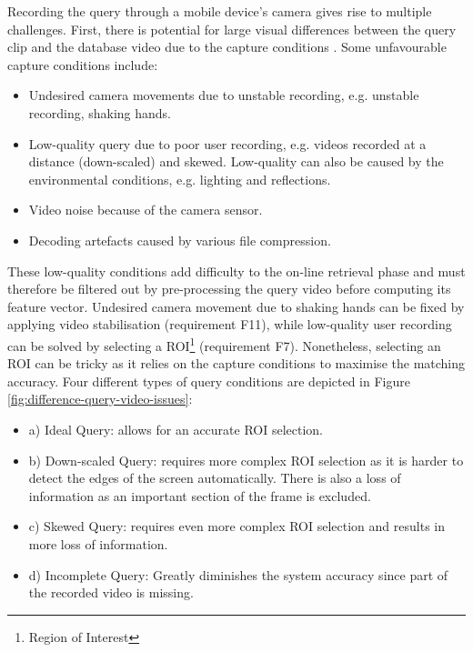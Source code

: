 Recording the query through a mobile device's camera gives rise to multiple challenges. First, there is potential for large visual differences between the query clip and the database video due to the capture conditions \cite{liu2014mobilevideosearch} \cite{wang2016actionregonition}. Some unfavourable capture conditions include:
\begin{itemize}
    \item Undesired camera movements due to unstable recording, e.g. unstable recording, shaking hands.
    \item Low-quality query due to poor user recording, e.g. videos recorded at a distance (down-scaled) and skewed. Low-quality can also be caused by the environmental conditions, e.g. lighting and reflections.
    \item Video noise because of the camera sensor.
    \item Decoding artefacts caused by various file compression.
\end{itemize}

These low-quality conditions add difficulty to the on-line retrieval phase and must therefore be filtered out by pre-processing the query video before computing its feature vector. Undesired camera movement due to shaking hands can be fixed by applying video stabilisation (requirement F11), while low-quality user recording can be solved by selecting a ROI\footnote{Region of Interest} (requirement F7). Nonetheless, selecting an ROI can be tricky as it relies on the capture conditions to maximise the matching accuracy. Four different types of query conditions are depicted in Figure \ref{fig:difference-query-video-issues}:
\begin{itemize}
    \item a) Ideal Query: allows for an accurate ROI selection.
    \item b) Down-scaled Query: requires more complex ROI selection as it is harder to detect the edges of the screen automatically. There is also a loss of information as an important section of the frame is excluded.
    \item c) Skewed Query: requires even more complex ROI selection and results in more loss of information.
    \item d) Incomplete Query: Greatly diminishes the system accuracy since part of the recorded video is missing.
\end{itemize}

